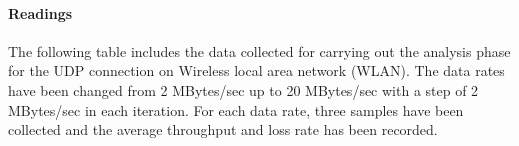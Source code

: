 \documentclass[aps,letterpaper,10pt]{revtex4}
\begin{document}
            \paragraph{Readings}
                The following table includes the data collected for carrying out the analysis phase for the UDP connection on Wireless local area network (WLAN). The data rates have been changed from 2 MBytes/sec up to 20 MBytes/sec with a step of 2 MBytes/sec in each iteration. For each data rate, three samples have been collected and the average throughput and loss rate has been recorded.
                \begin{figure}[htp]
                        \begin{center}
                        \end{center}    
                \end{figure}            

                \vspace{3mm}
\end{document}
